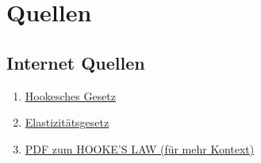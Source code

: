 \documentclass[../main.tex]{subfiles} %
\begin{document}
\listoffigures %

\section{Quellen}\label{sec:quellen}

    \subsection{Internet Quellen}\label{subsec:internet-quellen}
        \begin{enumerate}
            \item \href{https://de.wikipedia.org/wiki/Hookesches_Gesetz}{Hookesches Gesetz}
            \item \href{https://de.wikipedia.org/wiki/Elastizit%C3%A4tsgesetz}{Elastizitätsgesetz}
            \item \href{https://www.researchgate.net/publication/340022439_Hooke's_Law_Experiment}{PDF zum HOOKE’S LAW (für mehr Kontext)}
        \end{enumerate}
\end{document}
